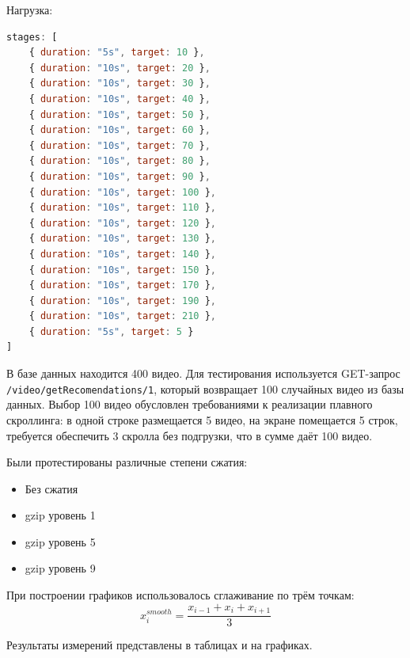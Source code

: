 \documentclass[12pt]{article}
\begin{document}
Нагрузка:
\begin{lstlisting}[language=JavaScript]
stages: [
    { duration: "5s", target: 10 },
    { duration: "10s", target: 20 },
    { duration: "10s", target: 30 },
    { duration: "10s", target: 40 },
    { duration: "10s", target: 50 },
    { duration: "10s", target: 60 },
    { duration: "10s", target: 70 },
    { duration: "10s", target: 80 },
    { duration: "10s", target: 90 },
    { duration: "10s", target: 100 },
    { duration: "10s", target: 110 },
    { duration: "10s", target: 120 },
    { duration: "10s", target: 130 },
    { duration: "10s", target: 140 },
    { duration: "10s", target: 150 },
    { duration: "10s", target: 170 },
    { duration: "10s", target: 190 },
    { duration: "10s", target: 210 },
    { duration: "5s", target: 5 }
]
\end{lstlisting}

В базе данных находится 400 видео. Для тестирования используется GET-запрос \verb|/video/getRecomendations/1|,
который возвращает 100 случайных видео из базы данных. Выбор 100 видео обусловлен требованиями к реализации плавного скроллинга:
в одной строке размещается 5 видео, на экране помещается 5 строк, требуется обеспечить 3 скролла без подгрузки, что в сумме даёт 100 видео.

Были протестированы различные степени сжатия:
\begin{itemize}
    \item Без сжатия
    \item gzip уровень 1
    \item gzip уровень 5
    \item gzip уровень 9
\end{itemize}

При построении графиков использовалось сглаживание по трём точкам:
\[
    x^{smooth}_{i} = \frac{x_{i-1} + x_{i} + x_{i+1}}{3}
\]

Результаты измерений представлены в таблицах и на графиках.
\end{document}
